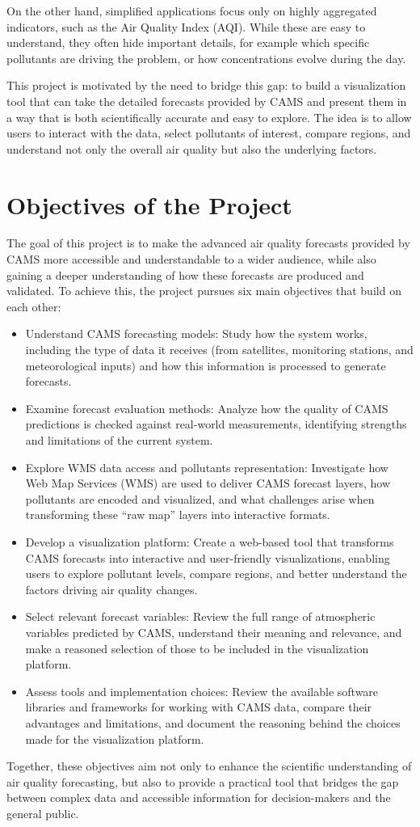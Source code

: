 On the other hand, simplified applications focus only on highly aggregated indicators, such as the Air Quality Index (AQI). While these are easy to understand, they often hide important details, for example which specific pollutants are driving the problem, or how concentrations evolve during the day.

This project is motivated by the need to bridge this gap: to build a visualization tool that can take the detailed forecasts provided by CAMS and present them in a way that is both scientifically accurate and easy to explore. The idea is to allow users to interact with the data, select pollutants of interest, compare regions, and understand not only the overall air quality but also the underlying factors.

\section{Objectives of the Project}

The goal of this project is to make the advanced air quality forecasts provided by CAMS more accessible and understandable to a wider audience, while also gaining a deeper understanding of how these forecasts are produced and validated. To achieve this, the project pursues six main objectives that build on each other:

\begin{itemize}
	\item Understand CAMS forecasting models: Study how the system works, including the type of data it receives (from satellites, monitoring stations, and meteorological inputs) and how this information is processed to generate forecasts.
	\item Examine forecast evaluation methods: Analyze how the quality of CAMS predictions is checked against real-world measurements, identifying strengths and limitations of the current system.
	\item Explore WMS data access and pollutants representation: Investigate how Web Map Services (WMS) are used to deliver CAMS forecast layers, how pollutants are encoded and visualized, and what challenges arise when transforming these “raw map” layers into interactive formats.
	\item Develop a visualization platform: Create a web-based tool that transforms CAMS forecasts into interactive and user-friendly visualizations, enabling users to explore pollutant levels, compare regions, and better understand the factors driving air quality changes.
	\item Select relevant forecast variables: Review the full range of atmospheric variables predicted by CAMS, understand their meaning and relevance, and make a reasoned selection of those to be included in the visualization platform.
	\item Assess tools and implementation choices: Review the available software libraries and frameworks for working with CAMS data, compare their advantages and limitations, and document the reasoning behind the choices made for the visualization platform.  
	
\end{itemize}

Together, these objectives aim not only to enhance the scientific understanding of air quality forecasting, but also to provide a practical tool that bridges the gap between complex data and accessible information for decision-makers and the general public.
